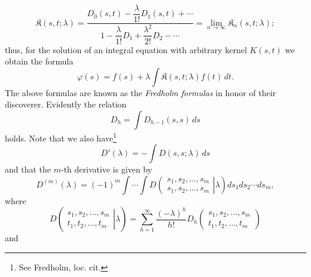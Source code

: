 \begin{equation}\tag{74}
\mathfrak{K}(s,t;\lambda)
=\frac{D_0(s,t)-\dfrac{\lambda}{1!}D_1(s,t)+\cdots}
{1-\dfrac{\lambda}{1!}D_1+\dfrac{\lambda^2}{2!}D_2-\cdots}
=\lim_{n\to\infty}\mathfrak{K}_n(s,t;\lambda);
\end{equation}
thus, for the solution of an integral equation with arbitrary kernel $K(s,t)$ we obtain the formula
\begin{equation}\tag{75}
\varphi(s)=f(s)+\lambda\int \mathfrak{K}(s,t;\lambda)f(t)\,dt.
\end{equation}
The above formulas are known as the \emph{Fredholm formulas} in honor of their discoverer. Evidently the relation
\begin{equation}\tag{76}
D_h=\int D_{h-1}(s,s)\,ds
\end{equation}
holds. Note that we also have\footnote{See Fredholm, loc. cit.}
\begin{equation}\tag{77}
D'(\lambda)=-\int D(s,s;\lambda)\,ds
\end{equation}
and that the $m$-th derivative is given by
\begin{equation}\tag{78}
D^{(m)}(\lambda)=(-1)^m\int\!\cdots\!\int
D\!\left(\left.\begin{matrix}s_1,s_2,\ldots,s_m\\s_1,s_2,\ldots,s_m\end{matrix}\right|\lambda\right)
 ds_1ds_2\cdots ds_m,
\end{equation}
where
\begin{equation}\tag{79}
D\!\left(\left.\begin{matrix}s_1,s_2,\ldots,s_m\\t_1,t_2,\ldots,t_m\end{matrix}\right|\lambda\right)
=\sum_{h=1}^{\infty}\frac{(-\lambda)^h}{h!}
D_h\!\left(\begin{matrix}s_1,s_2,\ldots,s_m\\t_1,t_2,\ldots,t_m\end{matrix}\right)
\end{equation}
and
